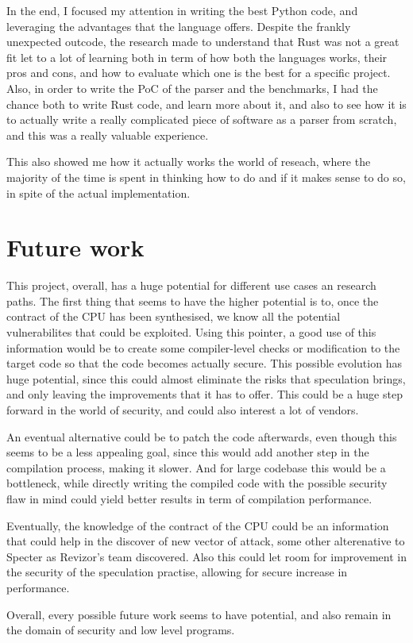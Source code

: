 In the end, I focused my attention in writing the best Python code, and
leveraging the advantages that the language offers. Despite the frankly unexpected
outcode, the research made to understand that Rust was not a great fit let to a
lot of learning both in term of how both the languages works, their pros and cons,
and how to evaluate which one is the best for a specific project. Also, in order
to write the PoC of the parser and the benchmarks, I had the chance both to write
Rust code, and learn more about it, and also to see how it is to actually write a
really complicated piece of software as a parser from scratch, and this was a
really valuable experience.

This also showed me how it actually works the world of reseach, where the majority
of the time is spent in thinking how to do and if it makes sense to do so, in
spite of the actual implementation.

\section{Future work}
\label{cha:Future work} This project, overall, has a huge potential for
different use cases an research paths. The first thing that seems to have the higher
potential is to, once the contract of the CPU has been synthesised, we know all the
potential vulnerabilites that could be exploited. Using this pointer, a good use
of this information would be to create some compiler-level checks or modification
to the target code so that the code becomes actually secure. This possible
evolution has huge potential, since this could almost eliminate the risks that speculation
brings, and only leaving the improvements that it has to offer. This could be a huge
step forward in the world of security, and could also interest a lot of vendors.

An eventual alternative could be to patch the code afterwards, even though this seems
to be a less appealing goal, since this would add another step in the
compilation process, making it slower. And for large codebase this would be a
bottleneck, while directly writing the compiled code with the possible security flaw
in mind could yield better results in term of compilation performance.

Eventually, the knowledge of the contract of the CPU could be an information
that could help in the discover of new vector of attack, some other alterenative
to Specter as Revizor's team discovered. Also this could let room for
improvement in the security of the speculation practise, allowing for secure increase
in performance.

Overall, every possible future work seems to have potential, and also remain in the
domain of security and low level programs.